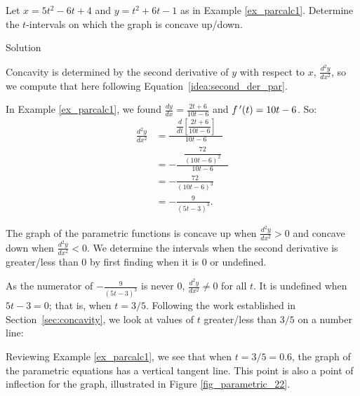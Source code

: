 \begin{example}\label{ex_parcalc4}
Let $x=5t^2-6t+4$ and $y=t^2+6t-1$ as in Example \ref{ex_parcalc1}. Determine the $t$-intervals on which the graph is concave up/down.

Solution 

Concavity is determined by the second derivative of $y$ with respect to $x$, $\frac{d^2y}{dx^2}$, so we compute that here following Equation~\eqref{idea:second_der_par}.

In Example \ref{ex_parcalc1}, we found $\frac{dy}{dx} = \frac{2t+6}{10t-6}$ and $f\,'(t) = 10t-6$. So:
\begin{align*}
\frac{d^2y}{dx^2} &=\frac{\quad\dfrac{d}{dt}\left[\dfrac{2t+6}{10t-6}\right]\quad}{10t-6}  \\[0.2cm]
				&= -\frac{\quad\dfrac{72}{(10t-6)^2}\quad}{10t-6}\\[0.2cm]
				&= -\frac{72}{(10t-6)^3} \\[0.2cm] &= -\frac{9}{(5t-3)^3}.
\end{align*}

The graph of the parametric functions is concave up when $\frac{d^2y}{dx^2} > 0$ and concave down when $\frac{d^2y}{dx^2} <0$. We determine the intervals when the second derivative is greater/less than 0 by first finding when it is 0 or undefined.

As the numerator of $ -\frac{9}{(5t-3)^3}$ is never 0, $\frac{d^2y}{dx^2} \neq 0$ for all $t$. It is undefined when $5t-3=0$; that is, when $t= 3/5$. Following the work established in Section~\ref{sec:concavity}, we look at values of $t$ greater/less than $3/5$ on a number line:

\begin{center}\end{center}

Reviewing Example \ref{ex_parcalc1}, we see that when $t=3/5=0.6$, the graph of the parametric equations has a vertical tangent line. This point is also a point of inflection for the graph, illustrated in Figure \ref{fig_parametric_22}.


\end{example}
